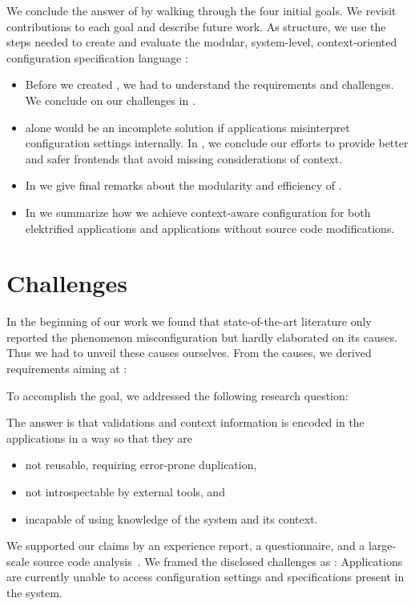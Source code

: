 We conclude the answer of  by walking through the four initial goals.
We revisit contributions to each goal and describe future work.
As structure, we use the steps needed to create and evaluate the modular, system-level, context-oriented configuration specification language :
\begin{itemize}
 \item Before we created , we had to understand the requirements and challenges.
 We conclude on our challenges in .
 \item {} alone would be an incomplete solution if applications misinterpret configuration settings internally.
 In , we conclude our efforts to provide better and safer frontends that avoid missing considerations of context.
 \item In  we give final remarks about the modularity and efficiency of .
 \item In  we summarize how we achieve context-aware configuration for both elektrified applications and applications without source code modifications.
\end{itemize}

















\section{Challenges}
\label{sec:conclusion-challenges}

In the beginning of our work we found that state-of-the-art literature only reported the phenomenon misconfiguration but hardly elaborated on its causes.
Thus we had to unveil these causes ourselves.
From the causes, we derived requirements aiming at :
\goalRequirements*

To accomplish the goal, we addressed the following research question:
\rqMotivation*

The answer is that validations and context information is encoded in the applications in a way so that they are~\cite{raab2017challenges}
\begin{itemize}
\item not reusable, requiring error-prone duplication, %
\item not introspectable by external tools, and
\item incapable of using knowledge of the system and its context.
\end{itemize}
We supported our claims by an experience report, a questionnaire, and a large-scale source code analysis~\cite{raab2017challenges}.
We framed the disclosed challenges as :
Applications are currently unable to access configuration settings and specifications present in the system.

